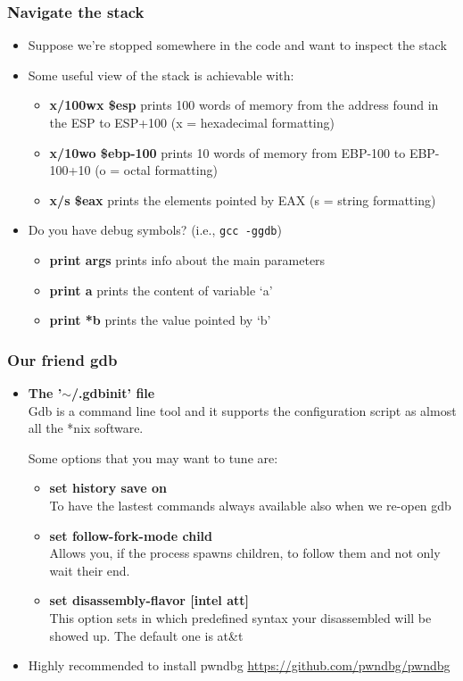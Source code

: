 \documentclass[]{beamer}
\begin{document}
\begin{frame}
  \frametitle{Navigate the stack}
  \begin{itemize}
  \item{Suppose we're stopped somewhere in the code and want to
      inspect the stack}
  \item{Some useful view of the stack is achievable with:}
    \begin{itemize}
    \item{{\bf x/100wx \$esp} prints 100 words of memory from the address found in the ESP to ESP+100 (x = hexadecimal formatting)}
    \item{{\bf x/10wo \$ebp-100} prints 10 words of memory from EBP-100 to EBP-100+10 (o = octal formatting)}
    \item{{\bf x/s \$eax} prints the elements pointed by EAX (s = string formatting)}
    \end{itemize}
  \item{Do you have debug symbols? (i.e., \texttt{gcc -ggdb})}
    \begin{itemize}
    \item{{\bf print args} prints info about the main parameters}
    \item{{\bf print a} prints the content of variable `a'}
    \item{{\bf print *b} prints the value pointed by `b'}
    \end{itemize}
  \end{itemize}
\end{frame}

\begin{frame}
  \frametitle{Our friend gdb}
  \begin{itemize}
  \item{{\bf The '$\sim$/.gdbinit' file}}\\
    Gdb is a command line tool and it supports the configuration script as almost all the *nix software.

    Some options that you may want to tune are:
    \begin{itemize}
    \item{{\bf set history save on}}\\
      To have the lastest commands always available also when we re-open gdb
    \item{{\bf set follow-fork-mode child}}\\
      Allows you, if the process spawns children, to follow them and not only wait their end.
    \item{{\bf set disassembly-flavor [intel \textpipe{}  att]}}\\
      This option sets in which predefined syntax your disassembled will be showed up. The default one is at\&t
    \end{itemize}
  \item Highly recommended to install pwndbg
    \url{https://github.com/pwndbg/pwndbg}
  \end{itemize}
\end{frame}
\end{document}
